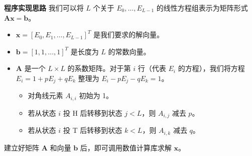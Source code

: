 \documentclass[UTF8]{ctexart}
\begin{document}
\textbf{程序实现思路}
我们可以将 $L$ 个关于 $E_0, \dots, E_{L-1}$ 的线性方程组表示为矩阵形式 $\mathbf{A} \mathbf{x} = \mathbf{b}$。
\begin{itemize}
    \item $\mathbf{x} = [E_0, E_1, \dots, E_{L-1}]^T$ 是我们要求的解向量。
    \item $\mathbf{b} = [1, 1, \dots, 1]^T$ 是长度为 $L$ 的常数向量。
    \item $\mathbf{A}$ 是一个 $L \times L$ 的系数矩阵。对于第 $i$ 行（代表 $E_i$ 的方程），我们将方程 $E_i = 1 + pE_j + qE_k$ 整理为 $E_i - pE_j - qE_k = 1$。
        \begin{itemize}
            \item 对角线元素 $A_{i,i}$ 初始为 1。
            \item 若从状态 $i$ 投 H 后转移到状态 $j < L$，则 $A_{i,j}$ 减去 $p$。
            \item 若从状态 $i$ 投 T 后转移到状态 $k < L$，则 $A_{i,k}$ 减去 $q$。
        \end{itemize}
\end{itemize}
建立好矩阵 $\mathbf{A}$ 和向量 $\mathbf{b}$ 后，即可调用数值计算库求解 $\mathbf{x}$。
\end{document}
